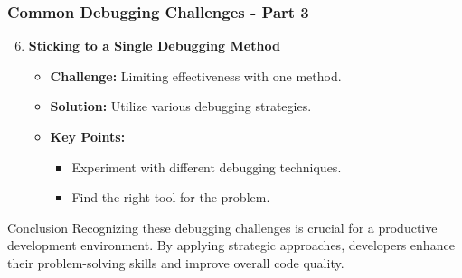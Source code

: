 \documentclass{beamer}
\begin{document}
\begin{frame}[fragile]
    \frametitle{Common Debugging Challenges - Part 3}
    \begin{enumerate}
        \setcounter{enumi}{5}
        \item \textbf{Sticking to a Single Debugging Method}
            \begin{itemize}
                \item \textbf{Challenge:} Limiting effectiveness with one method.
                \item \textbf{Solution:} Utilize various debugging strategies.
                \item \textbf{Key Points:}
                    \begin{itemize}
                        \item Experiment with different debugging techniques.
                        \item Find the right tool for the problem.
                    \end{itemize}
            \end{itemize}
    \end{enumerate}
    
    \begin{block}{Conclusion}
        Recognizing these debugging challenges is crucial for a productive development environment. By applying strategic approaches, developers enhance their problem-solving skills and improve overall code quality.
    \end{block}
\end{frame}
\end{document}
